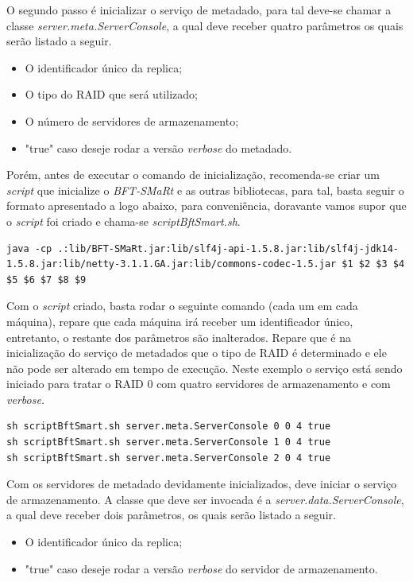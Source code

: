 O segundo passo é inicializar o serviço de metadado, para tal deve-se chamar a classe \textit{server.meta.ServerConsole}, a qual deve receber quatro parâmetros os quais serão listado a seguir. 
 
\begin{itemize}
	\item O identificador único da replica;
	\item O tipo do RAID que será utilizado;
	\item O número de servidores de armazenamento;
	\item "true" caso deseje rodar a versão \textit{verbose} do metadado.
\end{itemize}

Porém, antes de executar o comando de inicialização, recomenda-se criar um \textit{script} que inicialize o \textit{BFT-SMaRt} e as outras bibliotecas, para tal, basta seguir o formato apresentado a logo abaixo, para conveniência, doravante vamos supor que o \textit{script} foi criado e chama-se \textit{scriptBftSmart.sh}.

\begin{lstlisting}
java -cp .:lib/BFT-SMaRt.jar:lib/slf4j-api-1.5.8.jar:lib/slf4j-jdk14-1.5.8.jar:lib/netty-3.1.1.GA.jar:lib/commons-codec-1.5.jar $1 $2 $3 $4 $5 $6 $7 $8 $9
\end{lstlisting}

Com o \textit{script} criado, basta rodar o seguinte comando (cada um em cada máquina), repare que cada máquina irá receber um identificador único, entretanto, o restante dos parâmetros são inalterados. Repare que é na inicialização do serviço de metadados que o tipo de RAID é determinado e ele não pode ser alterado em tempo de execução. Neste exemplo o serviço está sendo iniciado para tratar o RAID 0 com quatro servidores de armazenamento e com \textit{verbose.}
\\

\begin{lstlisting}
sh scriptBftSmart.sh server.meta.ServerConsole 0 0 4 true
sh scriptBftSmart.sh server.meta.ServerConsole 1 0 4 true
sh scriptBftSmart.sh server.meta.ServerConsole 2 0 4 true
\end{lstlisting}

Com os servidores de metadado devidamente inicializados, deve iniciar o serviço de armazenamento. A classe que deve ser invocada é a \textit{server.data.ServerConsole}, a qual deve receber dois parâmetros, os quais serão listado a seguir. 

\begin{itemize}
	\item O identificador único da replica;
	\item "true" caso deseje rodar a versão \textit{verbose} do servidor de armazenamento.
\end{itemize}

